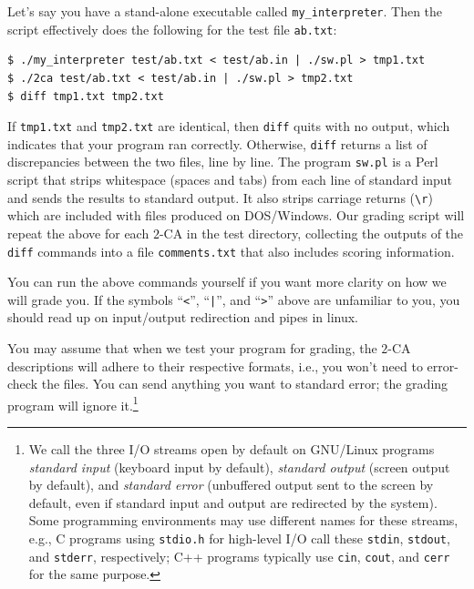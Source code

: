 \documentclass[11pt]{article}
\renewcommand{\t}[1]{\texttt{#1}}
\theoremstyle{definition}
\begin{document}
Let's say you have a stand-alone executable called \t{my\_interpreter}.
Then the script effectively does the following for the test file \t{ab.txt}:
\begin{verbatim}
$ ./my_interpreter test/ab.txt < test/ab.in | ./sw.pl > tmp1.txt
$ ./2ca test/ab.txt < test/ab.in | ./sw.pl > tmp2.txt
$ diff tmp1.txt tmp2.txt
\end{verbatim}
If \t{tmp1.txt} and \t{tmp2.txt} are identical, then \t{diff} quits with no output, which indicates that your program ran correctly.  Otherwise, \t{diff} returns a list of discrepancies between the two files, line by line.  The program \t{sw.pl} is a Perl script that strips whitespace (spaces and tabs) from each line of standard input and sends the results to standard output.  It also strips carriage returns (\verb+\r+) which are included with files produced on DOS/Windows.  Our grading script will repeat the above for each $2$-CA in the test directory, collecting the outputs of the \t{diff} commands into a file \t{comments.txt} that also includes scoring information.

You can run the above commands yourself if you want more clarity on how we will grade you.  If the symbols ``\t{<}'', ``\t{|}'', and ``\t{>}'' above are unfamiliar to you, you should read up on input/output redirection and pipes in linux.


You may assume that when we test your program for grading, the $2$-CA descriptions will adhere to their respective formats, i.e., you won't need to error-check the files.  You can send anything you want to standard error; the grading program will ignore it.\footnote{We call the three I/O streams open by default on GNU/Linux programs \emph{standard input} (keyboard input by default), \emph{standard output} (screen output by default), and \emph{standard error} (unbuffered output sent to the screen by default, even if standard input and output are redirected by the system).  Some programming environments may use different names for these streams, e.g., C programs using \t{stdio.h} for high-level I/O call these \t{stdin}, \t{stdout}, and \t{stderr}, respectively; C++ programs typically use \t{cin}, \t{cout}, and \t{cerr} for the same purpose.}
\end{document}

